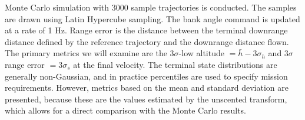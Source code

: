 
Monte Carlo simulation with 3000 sample trajectories is conducted. The samples are drawn using Latin Hypercube sampling. The bank angle command is updated at a rate of 1 Hz. Range error is the distance between the terminal downrange distance defined by the reference trajectory and the downrange distance flown. The primary metrics we will examine are the 3$\sigma$-low altitude $=\bar{h}-3\sigma_h$ and 3$\sigma$ range error $= 3\sigma_s$ at the final velocity. The terminal state distributions are generally non-Gaussian, and in practice percentiles are used to specify mission requirements. However, metrics based on the mean and standard deviation are presented, because these are the values estimated by the unscented transform, which allows for a direct comparison with the Monte Carlo results.

